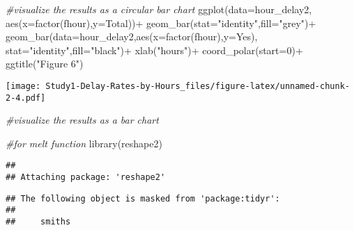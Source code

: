 \documentclass[
]{article}
\newenvironment{Shaded}{\begin{snugshade}}{\end{snugshade}}
\newcommand{\AttributeTok}[1]{\textcolor[rgb]{0.77,0.63,0.00}{#1}}
\newcommand{\CommentTok}[1]{\textcolor[rgb]{0.56,0.35,0.01}{\textit{#1}}}
\newcommand{\DecValTok}[1]{\textcolor[rgb]{0.00,0.00,0.81}{#1}}
\newcommand{\FunctionTok}[1]{\textcolor[rgb]{0.00,0.00,0.00}{#1}}
\newcommand{\NormalTok}[1]{#1}
\newcommand{\SpecialCharTok}[1]{\textcolor[rgb]{0.00,0.00,0.00}{#1}}
\newcommand{\StringTok}[1]{\textcolor[rgb]{0.31,0.60,0.02}{#1}}
\begin{document}
\begin{Shaded}
\begin{Highlighting}[]
\CommentTok{\#visualize the results as a circular bar chart}
\FunctionTok{ggplot}\NormalTok{(}\AttributeTok{data=}\NormalTok{hour\_delay2, }\FunctionTok{aes}\NormalTok{(}\AttributeTok{x=}\FunctionTok{factor}\NormalTok{(fhour),}\AttributeTok{y=}\NormalTok{Total))}\SpecialCharTok{+}
  \FunctionTok{geom\_bar}\NormalTok{(}\AttributeTok{stat=}\StringTok{"identity"}\NormalTok{,}\AttributeTok{fill=}\StringTok{"grey"}\NormalTok{)}\SpecialCharTok{+}
  \FunctionTok{geom\_bar}\NormalTok{(}\AttributeTok{data=}\NormalTok{hour\_delay2,}\FunctionTok{aes}\NormalTok{(}\AttributeTok{x=}\FunctionTok{factor}\NormalTok{(fhour),}\AttributeTok{y=}\NormalTok{Yes),}
    \AttributeTok{stat=}\StringTok{"identity"}\NormalTok{,}\AttributeTok{fill=}\StringTok{"black"}\NormalTok{)}\SpecialCharTok{+}
    \FunctionTok{xlab}\NormalTok{(}\StringTok{"hours"}\NormalTok{)}\SpecialCharTok{+}
  \FunctionTok{coord\_polar}\NormalTok{(}\AttributeTok{start=}\DecValTok{0}\NormalTok{)}\SpecialCharTok{+}
  \FunctionTok{ggtitle}\NormalTok{(}\StringTok{"Figure 6"}\NormalTok{)}
\end{Highlighting}
\end{Shaded}

\texttt{[image: Study1-Delay-Rates-by-Hours\_files/figure-latex/unnamed-chunk-2-4.pdf]}

\begin{Shaded}
\begin{Highlighting}[]
\CommentTok{\#visualize the results as a bar chart}

\CommentTok{\#for melt function}
\FunctionTok{library}\NormalTok{(reshape2)}
\end{Highlighting}
\end{Shaded}

\begin{verbatim}
## 
## Attaching package: 'reshape2'
\end{verbatim}

\begin{verbatim}
## The following object is masked from 'package:tidyr':
## 
##     smiths
\end{verbatim}
\end{document}
